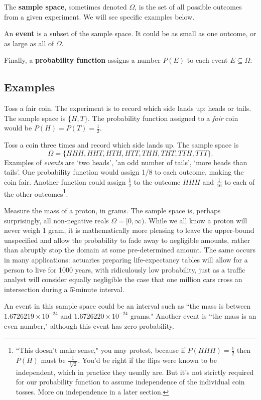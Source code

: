 \documentclass[../main.tex]{subfiles}
\begin{document}
The \textbf{sample space}, sometimes denoted $\Omega$, is the set of all possible outcomes from a given experiment. We will see specific examples below.

An \textbf{event} is a subset of the sample space. It could be as small as one outcome, or as large as all of $\Omega$.

Finally, a \textbf{probability function} assigns a number $P(E)$ to
each event $E \subseteq \Omega$.

\subsection{Examples}

\begin{example} Toss a fair coin. The experiment is to record which
	side lands up: heads or tails. The sample space is $\{H,T\}$.
	The probability function assigned to a \textit{fair} coin 
	would be $P(H)=P(T)=\frac12$.
\end{example}

\begin{example}
Toss a coin three times and record which side lands up. The sample space
is $$\Omega=\{HHH, HHT, HTH, HTT, THH, THT, TTH, TTT\}.$$ Examples of \textit{events}
are `two heads', 'an odd number of tails', `more heads than tails'. One probability
function would assign 1/8 to each outcome, making the coin fair.
Another function could assign $\frac12$ to the outcome $HHH$ and $\frac{1}{16}$ to each of the other outcomes\footnote{``This
	doesn't make sense," you may protest, because if $P(HHH)=\frac12$ then $P(H)$ must be $\frac{1}{\sqrt[3]{2}}$.
	You'd be right if the flips were known to be independent, which in practice they usually are. But
	it's not strictly required for our probability function to assume independence of the 
	individual coin tosses. More on independence in a later section.}.
\end{example}

\begin{example}
	Measure the mass of a proton, in grams. The sample space is, perhaps	surprisingly, all non-negative reals $\Omega=[0,\infty)$. While we all know a proton will never weigh
	1 gram, it is mathematically more pleasing to leave the upper-bound unspecified and allow the probability to fade away
	to negligible amounts, rather than abruptly stop the domain at
	some pre-determined amount. The same occurs in many applications: actuaries preparing life-expectancy tables will allow for a 
	person to live for 1000 years, with ridiculously low probability,
	just as a traffic analyst will consider equally negligible the
	case that one million cars cross an intersection during a 5\~-minute
	interval.
	
	An event in this sample space could be an interval such as
	``the mass is between $1.6726219\times10^{-24}$ and
	$1.6726220\times10^{-24}$ grams." Another event is ``the
	mass is an even number," although this event has zero probability.
\end{example}
\end{document}
